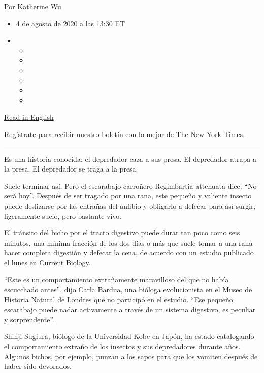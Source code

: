 Por Katherine Wu

\begin{itemize}
\item
  4 de agosto de 2020 a las 13:30 ET
\item
  \begin{itemize}
  \item
  \item
  \item
  \item
  \item
  \item
  \end{itemize}
\end{itemize}

\href{https://www.nytimes.com/2020/08/03/science/beetle-frog-poop.html}{Read
in English}

\href{https://www.nytimes.com/newsletters/el-times}{Regístrate para
recibir nuestro boletín} con lo mejor de The New York Times.

\begin{center}\rule{0.5\linewidth}{\linethickness}\end{center}

Es una historia conocida: el depredador caza a sus presa. El depredador
atrapa a la presa. El depredador se traga a la presa.

Suele terminar así. Pero el escarabajo carroñero Regimbartia attenuata
dice: ``No será hoy''. Después de ser tragado por una rana, este pequeño
y valiente insecto puede deslizarse por las entrañas del anfibio y
obligarlo a defecar para así surgir, ligeramente sucio, pero bastante
vivo.

El tránsito del bicho por el tracto digestivo puede durar tan poco como
seis minutos, una mínima fracción de los dos días o más que suele tomar
a una rana hacer completa digestión y defecar la cena, de acuerdo con un
estudio publicado el lunes en
\href{http://dx.doi.org/10.1016/j.cub.2020.06.026}{Current Biology}.

``Este es un comportamiento extrañamente maravilloso del que no había
escucchado antes'', dijo Carla Bardua, una bióloga evolucionista en el
Museo de Historia Natural de Londres que no participó en el estudio.
``Ese pequeño escarabajo puede nadar activamente a través de un sistema
digestivo, es peculiar y sorprendente''.

Shinji Sugiura, biólogo de la Universidad Kobe en Japón, ha estado
catalogando el \href{https://peerj.com/articles/5942/}{comportamiento
extraño de los insectos} y sus depredadores durante años. Algunos
bichos, por ejemplo, punzan a los sapos
\href{https://www.nytimes.com/2018/02/06/science/bombardier-beetle-toad-vomit.html}{para
que los vomiten} después de haber sido devorados.

